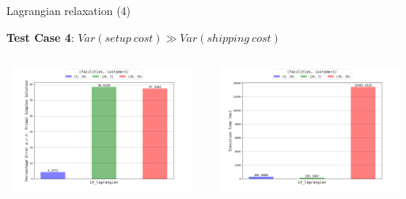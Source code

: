 \documentclass{beamer}
\begin{document}
	    \begin{frame}{Lagrangian relaxation (4)}
	    
        \textbf{Test Case 4}: $Var(setup \ cost) \gg Var(shipping \ cost)$
        
        
        \begin{columns}
	   \centering
        \includegraphics[width=6.5cm,height=4.2cm]{img/chart_error_lagrangian_3.png}
        
        \centering
        \includegraphics[width=6.5cm,height=4.2cm]{img/chart_time_lagrangian_3.png}
        \end{columns}
        
	    \end{frame}
	    
\end{document}
